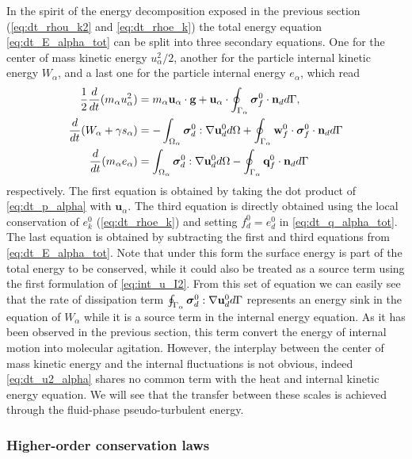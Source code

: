 In the spirit of the energy decomposition exposed in the previous section (\ref{eq:dt_rhou_k2} and \ref{eq:dt_rhoe_k}) the total energy equation \ref{eq:dt_E_alpha_tot} can be split into three secondary equations. 
One for the center of mass kinetic energy $u_\alpha^2/2$, another for the particle internal kinetic energy $W_\alpha$, and a last one for the particle internal energy $e_\alpha$, which read
\begin{align}
    \label{eq:dt_u2_alpha}
    \frac{1}{2}\ddt (m_\alpha u_\alpha^2)
    &= 
    m_\alpha\textbf{u}_\alpha\cdot
    \textbf{g}
    + 
    \textbf{u}_\alpha\cdot
    \intS{\bm\sigma_f^0 \cdot \textbf{n}_d},\\
    \label{eq:dt_w2_alpha}
    \ddt (W_\alpha + \gamma s_\alpha)
    &= 
    - \intO{ \bm{\sigma}_d^0 : \grad\textbf{u}_d^0 }
    + \intS {\textbf{w}_f^0 \cdot \bm{\sigma}_f^0 \cdot \textbf{n}_d }
    \\
     \label{eq:dt_e_alpha}
    \ddt (m_\alpha e_\alpha )
    &= 
     \intO{ \bm{\sigma}_d^0 : \grad\textbf{u}_d^0  }
    -  \intS{\textbf{q}_f^0\cdot \textbf{n}_d } 
\end{align}
respectively. 
The first equation is obtained by taking the dot product of \ref{eq:dt_p_alpha} with $\textbf{u}_\alpha$. 
The third equation is directly obtained using the local conservation of $e_k^0$ (\ref{eq:dt_rhoe_k}) and setting $f_d^0 = e_d^0$ in \ref{eq:dt_q_alpha_tot}.
The last equation is obtained by subtracting the first and third equations from \ref{eq:dt_E_alpha_tot}. 
Note that under this form the surface energy is part of the total energy to be conserved, while it could also be treated as a source term using the first formulation of \ref{eq:int_u_I2}.
From this set of equation we can easily see that the rate of dissipation term $\oint_{\Gamma_{\alpha}} \bm{\sigma}_d^0 : \mathbf{\nabla}\textbf{u}_d^0 d\Gamma$ represents an energy sink in the equation of $W_\alpha$ while it is a source term in the internal energy equation. 
As it has been observed in the previous section, this term convert the energy of internal motion into molecular agitation. 
However, the interplay between the center of mass kinetic energy and the internal fluctuations is not obvious, indeed \ref{eq:dt_u2_alpha} shares no common term with the heat and internal kinetic energy equation.
We will see that the transfer between these scales is achieved through the fluid-phase pseudo-turbulent energy. 



\subsubsection{Higher-order conservation laws}


